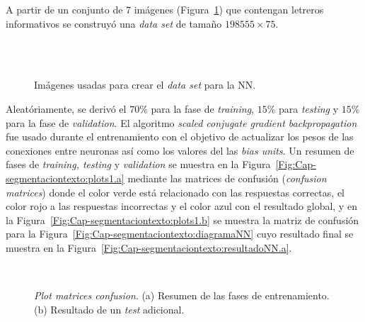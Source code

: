 A partir de un conjunto de 7 imágenes 
(Figura~\ref{Fig:Cap-segmentaciontexto:dataNN}) que contengan letreros
informativos se construyó una \textit{data set} de tamaño $198555 \times 75$.

\begin{figure}[h!]
	\centering
   { }
   { }
   { }
   \\
   { }
   { }
   \\
	\caption{Imágenes usadas para crear el \textit{data set} para la NN.}
	\label{Fig:Cap-segmentaciontexto:dataNN}
\end{figure}

Aleatóriamente, se derivó el $70 \%$ para la fase de \textit{training}, 
$15 \%$ para \textit{testing} y $15 \%$ para la fase de \textit{validation}. El
algoritmo \textit{scaled conjugate gradient backpropagation}
\cite{Moller:1993:ScaledGD} fue usado durante el entrenamiento con el objetivo
de actualizar los pesos de las conexiones entre neuronas así como los valores
del las \textit{bias units}. Un resumen de fases de \textit{training, testing} y
\textit{validation} se muestra en la
Figura~\ref{Fig:Cap-segmentaciontexto:plots1.a} mediante las matrices de
confusión (\textit{confusion matrices}) donde el color verde está relacionado
con las respuestas correctas, el color rojo a las respuestas incorrectas y el
color azul con el resultado global, y en la
Figura~\ref{Fig:Cap-segmentaciontexto:plots1.b} se muestra la matriz de
confusión para la Figura~\ref{Fig:Cap-segmentaciontexto:diagramaNN} cuyo
resultado final se muestra en la
Figura~\ref{Fig:Cap-segmentaciontexto:resultadoNN.a}.

\begin{figure}[h!]
	\centering
   { }
   \\
  \caption[\textit{Plot matrices confusion}]{\textit{Plot matrices confusion}.
  (a) Resumen de las fases de entrenamiento. (b) Resultado de un \textit{test}
adicional.}
	\label{Fig:Cap-segmentaciontexto:plots1}
\end{figure}


